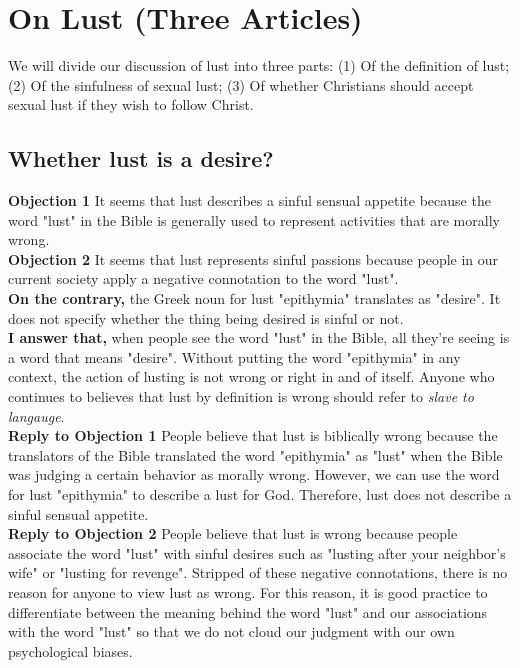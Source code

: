 \documentclass[a4paper, parskip=full, 12pt]{article}
\begin{document}
\section{On Lust (Three Articles)}
We will divide our discussion of lust into three parts: (1) Of the definition of lust; (2) Of the sinfulness of sexual lust; (3) Of whether Christians should accept sexual lust if they wish to follow Christ.
\subsection{Whether lust is a desire?}
\textbf{Objection 1} It seems that lust describes a sinful sensual appetite because the word "lust" in the Bible is generally used to represent activities that are morally wrong. \\
\textbf{Objection 2} It seems that lust represents sinful passions because people in our current society apply a negative connotation to the word "lust". \\
\textbf{On the contrary,} the Greek noun for lust "epithymia" translates as "desire". It does not specify whether the thing being desired is sinful or not. \\
\textbf{I answer that,} when people see the word "lust" in the Bible, all they're seeing is a word that means "desire". Without putting the word "epithymia" in any context, the action of lusting is not wrong or right in and of itself. Anyone who continues to believes that lust by definition is wrong should refer to \textit{slave to langauge}. \\
\textbf{Reply to Objection 1} People believe that lust is biblically wrong because the translators of the Bible translated the word "epithymia" as "lust" when the Bible was judging a certain behavior as morally wrong. However, we can use the word for lust "epithymia" to describe a lust for God. Therefore, lust does not describe a sinful sensual appetite. \\
\textbf{Reply to Objection 2} People believe that lust is wrong because people associate the word "lust" with sinful desires such as "lusting after your neighbor's wife" or "lusting for revenge". Stripped of these negative connotations, there is no reason for anyone to view lust as wrong. For this reason, it is good practice to differentiate between the meaning behind the word "lust" and our associations with the word "lust" so that we do not cloud our judgment with our own psychological biases. \\
\end{document}
